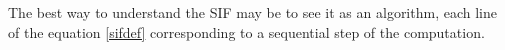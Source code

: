 %

	The best way to understand the SIF may be to see it as an algorithm, each line of the equation \ref{sifdef} corresponding to a sequential step of the computation.


